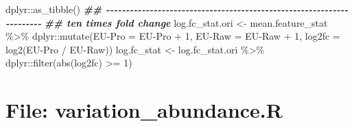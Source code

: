 \documentclass[
]{article}
\newenvironment{Shaded}{\begin{snugshade}}{\end{snugshade}}
\newcommand{\AttributeTok}[1]{\textcolor[rgb]{0.77,0.63,0.00}{#1}}
\newcommand{\DecValTok}[1]{\textcolor[rgb]{0.00,0.00,0.81}{#1}}
\newcommand{\DocumentationTok}[1]{\textcolor[rgb]{0.56,0.35,0.01}{\textbf{\textit{#1}}}}
\newcommand{\FunctionTok}[1]{\textcolor[rgb]{0.00,0.00,0.00}{#1}}
\newcommand{\NormalTok}[1]{#1}
\newcommand{\OtherTok}[1]{\textcolor[rgb]{0.56,0.35,0.01}{#1}}
\newcommand{\SpecialCharTok}[1]{\textcolor[rgb]{0.00,0.00,0.00}{#1}}
\newcommand{\StringTok}[1]{\textcolor[rgb]{0.31,0.60,0.02}{#1}}
\begin{document}
\begin{Shaded}
\begin{Highlighting}[]
\NormalTok{  dplyr}\SpecialCharTok{::}\FunctionTok{as\_tibble}\NormalTok{()}
\DocumentationTok{\#\# {-}{-}{-}{-}{-}{-}{-}{-}{-}{-}{-}{-}{-}{-}{-}{-}{-}{-}{-}{-}{-}{-}{-}{-}{-}{-}{-}{-}{-}{-}{-}{-}{-}{-}{-}{-}{-}{-}{-}{-}{-}{-}{-}{-}{-}{-}{-}{-}{-}{-}{-}{-}{-}{-}{-}{-}{-}{-}{-}{-}{-}{-}{-}{-}{-}{-}{-}{-}{-}{-} }
\DocumentationTok{\#\# ten times fold change}
\NormalTok{log.fc\_stat.ori }\OtherTok{\textless{}{-}}\NormalTok{ mean.feature\_stat }\SpecialCharTok{\%\textgreater{}\%} 
\NormalTok{  dplyr}\SpecialCharTok{::}\FunctionTok{mutate}\NormalTok{(}\StringTok{\textasciigrave{}}\AttributeTok{EU{-}Pro}\StringTok{\textasciigrave{}} \OtherTok{=} \StringTok{\textasciigrave{}}\AttributeTok{EU{-}Pro}\StringTok{\textasciigrave{}} \SpecialCharTok{+} \DecValTok{1}\NormalTok{,}
                \StringTok{\textasciigrave{}}\AttributeTok{EU{-}Raw}\StringTok{\textasciigrave{}} \OtherTok{=} \StringTok{\textasciigrave{}}\AttributeTok{EU{-}Raw}\StringTok{\textasciigrave{}} \SpecialCharTok{+} \DecValTok{1}\NormalTok{,}
                \AttributeTok{log2fc =} \FunctionTok{log2}\NormalTok{(}\StringTok{\textasciigrave{}}\AttributeTok{EU{-}Pro}\StringTok{\textasciigrave{}} \SpecialCharTok{/} \StringTok{\textasciigrave{}}\AttributeTok{EU{-}Raw}\StringTok{\textasciigrave{}}\NormalTok{))}
\NormalTok{log.fc\_stat }\OtherTok{\textless{}{-}}\NormalTok{ log.fc\_stat.ori }\SpecialCharTok{\%\textgreater{}\%} 
\NormalTok{  dplyr}\SpecialCharTok{::}\FunctionTok{filter}\NormalTok{(}\FunctionTok{abs}\NormalTok{(log2fc) }\SpecialCharTok{\textgreater{}=} \DecValTok{1}\NormalTok{)}
\end{Highlighting}
\end{Shaded}

\hypertarget{file-variation_abundance.r}{%
\section{File: variation\_abundance.R}\label{file-variation_abundance.r}}
\end{document}
